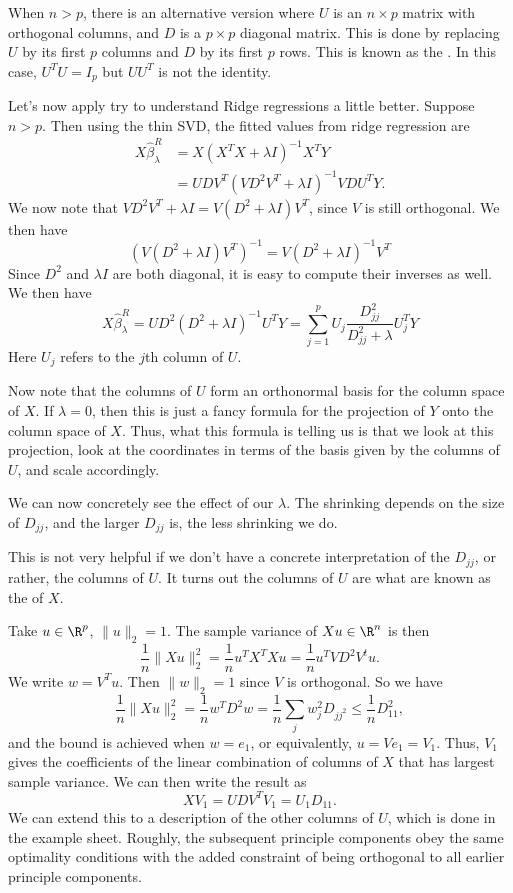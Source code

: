 \documentclass[a4paper]{article}
\begin{document}
When $n > p$, there is an alternative version where $U$ is an $n \times p$ matrix with orthogonal columns, and $D$ is a $p \times p$ diagonal matrix. This is done by replacing $U$ by its first $p$ columns and $D$ by its first $p$ rows. This is known as the . In this case, $U^T U = I_p$ but $UU^T$ is not the identity.

Let's now apply try to understand Ridge regressions a little better. Suppose $n > p$. Then using the thin SVD, the fitted values from ridge regression are
\begin{align*}
  X \hat{\beta}_\lambda^R &= X (X^T X + \lambda I)^{-1} X^T Y\\
  &= UDV^T (VD^2 V^T + \lambda I)^{-1} VDU^T Y.
\end{align*}
We now note that $VD^2 V^T + \lambda I = V(D^2 + \lambda I)V^T$, since $V$ is still orthogonal. We then have
\[
  (V (D^2 + \lambda I)V^T)^{-1} = V(D^2 + \lambda I)^{-1} V^T
\]
Since $D^2$ and $\lambda I$ are both diagonal, it is easy to compute their inverses as well. We then have
\[
  X\hat{\beta}_\lambda^R = UD^2 (D^2 + \lambda I)^{-1} U^T Y = \sum_{j = 1}^p U_j \frac{D_{jj}^2}{ D_{jj}^2 + \lambda} U_j^T Y
\]
Here $U_j$ refers to the $j$th column of $U$.

Now note that the columns of $U$ form an orthonormal basis for the column space of $X$. If $\lambda = 0$, then this is just a fancy formula for the projection of $Y$ onto the column space of $X$. Thus, what this formula is telling us is that we look at this projection, look at the coordinates in terms of the basis given by the columns of $U$, and scale accordingly.

We can now concretely see the effect of our $\lambda$. The shrinking depends on the size of $D_{jj}$, and the larger $D_{jj}$ is, the less shrinking we do.

This is not very helpful if we don't have a concrete interpretation of the $D_{jj}$, or rather, the columns of $U$. It turns out the columns of $U$ are what are known as the  of $X$.

Take $u \in \R^p$, $\|u\|_2 = 1$. The sample variance of $Xu \in \R^n$ is then
\[
  \frac{1}{n} \|Xu\|_2^2 = \frac{1}{n} u^T X^T X u = \frac{1}{n} u^T VD^2 V^t u.
\]
We write $w = V^T u$. Then $\|w\|_2 = 1$ since $V$ is orthogonal. So we have
\[
  \frac{1}{n} \|Xu\|_2^2 = \frac{1}{n} w^T D^2 w = \frac{1}{n} \sum_j w_j^2 D_{jj^2} \leq \frac{1}{n} D_{11}^2,
\]
and the bound is achieved when $w = e_1$, or equivalently, $u = V e_1 = V_1$. Thus, $V_1$ gives the coefficients of the linear combination of columns of $X$ that has largest sample variance. We can then write the result as
\[
  X V_1 = U DV^T V_1 = U_1 D_{11}.
\]
We can extend this to a description of the other columns of $U$, which is done in the example sheet. Roughly, the subsequent principle components obey the same optimality conditions with the added constraint of being orthogonal to all earlier principle components.
\end{document}
